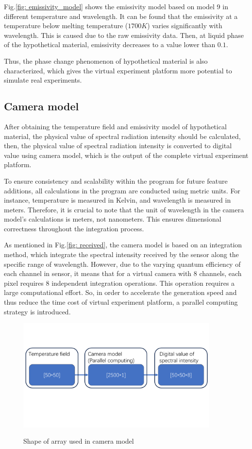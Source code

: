 Fig.\ref{fig: emissivity_model} shows the emissivity model based 
on model 9 in different temperature 
and wavelength. It can be found that the emissivity at a temperature 
below melting temperature ($1700K$) varies significantly with wavelength.
This is caused due to the raw emissivity data. Then, at liquid phase of 
the hypothetical material, emissivity decreases to a value lower than $0.1$.


Thus, the phase change phenomenon of hypothetical material is also characterized, 
which gives the virtual experiment platform more potential to simulate 
real experiments.


\subsection{Camera model}
After obtaining the temperature field and emissivity model of hypothetical material, 
the physical value of spectral radiation intensity should be calculated, then, 
the physical value of spectral radiation intensity is converted to 
digital value using camera model, which is the output of the complete virtual 
experiment platform. 


To ensure consistency and scalability within the program for future feature 
additions, all calculations in the program are conducted using metric units. 
For instance, temperature is measured in Kelvin, and wavelength is measured in 
meters. Therefore, it is crucial to note that the unit of wavelength in the camera 
model's calculations is meters, not nanometers. This ensures dimensional 
correctness throughout the integration process.


As mentioned in Fig.\ref{fig: received}, the camera model is based on an integration 
method, which integrate the spectral intensity received by the sensor along the 
specific range of wavelength. However, due to the varying quantum 
efficiency of each channel in sensor, it means that for a virtual camera 
with 8 channels, each pixel requires 8 independent integration operations. 
This operation requires a large computational effort. So, in order to 
accelerate the generation speed and thus reduce the time cost of virtual 
experiment platform, a parallel computing strategy is introduced.


\begin{figure}[htbp]
  \centering
  \includegraphics[width=0.9\textwidth]{figures/reshape.pdf}
  \label{fig: reshape}
  \caption{Shape of array used in camera model}
\end{figure}


